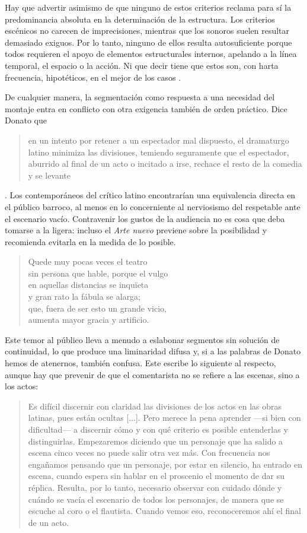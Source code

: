 Hay que advertir asimismo de que ninguno de estos criterios reclama para sí la predominancia absoluta en la determinación de la estructura. Los criterios escénicos no carecen de imprecisiones, mientras que los sonoros suelen resultar demasiado exiguos. Por lo tanto, ninguno de ellos resulta autosuficiente porque todos requieren el apoyo de elementos estructurales internos, apelando a la línea temporal, el espacio o la acción. Ni que decir tiene que estos son, con harta frecuencia, hipotéticos, en el mejor de los casos \parencite[127]{oleza2010}.

De cualquier manera, la segmentación como respuesta a una necesidad del  montaje entra en conflicto con otra exigencia también de orden práctico. Dice Donato que \blockquote{en un intento por retener a un espectador mal dispuesto, el dramaturgo latino minimiza las divisiones, temiendo seguramente que el espectador, aburrido al final de un acto o incitado a irse, rechace el resto de la comedia y se levante} \parencite[pp. 3-4; traducción propia]{donatus300b}. Los contemporáneos del crítico latino encontrarían una equivalencia directa en el público barroco, al menos en lo concerniente al nerviosismo del respetable ante el escenario vacío. Contravenir los gustos de la audiencia no es cosa que deba tomarse a la ligera: incluso el \textit{Arte nuevo} previene sobre la posibilidad y recomienda evitarla en la medida de lo posible.

\blockquote{Quede muy pocas veces el teatro\\sin persona que hable, porque el vulgo\\en aquellas distancias se inquïeta\\y gran rato la fábula se alarga;\\que, fuera de ser esto un grande vicio,\\aumenta mayor gracia y artificio. \parencite[240-245]{vega2006}}

Este temor al público lleva a menudo a eslabonar segmentos sin solución de continuidad, lo que produce una liminaridad difusa y, si a las palabras de Donato hemos de atenernos, también confusa. Este escribe lo siguiente al respecto, aunque hay que prevenir de que el comentarista no se refiere a las escenas, sino a los actos:

\blockquote{Es difícil discernir con claridad las divisiones de los actos en las obras latinas, pues están ocultas [...]. Pero merece la pena aprender —\nolinebreak si bien con dificultad\nolinebreak— a discernir  cómo y con qué criterio es posible entenderlas y distinguirlas. Empezaremos diciendo que un personaje que ha salido a escena cinco veces no puede salir otra vez más. Con frecuencia nos engañamos pensando que un personaje, por estar en silencio, ha entrado en escena, cuando espera sin hablar en el proscenio el momento de dar su réplica. Resulta, por lo tanto, necesario observar con cuidado dónde y cuándo se vacía el escenario de todos los personajes, de manera que se escuche al coro o el flautista. Cuando vemos eso, reconoceremos ahí el final de un acto. \parencite[p. 5; traducción propia]{donatus300c}}

